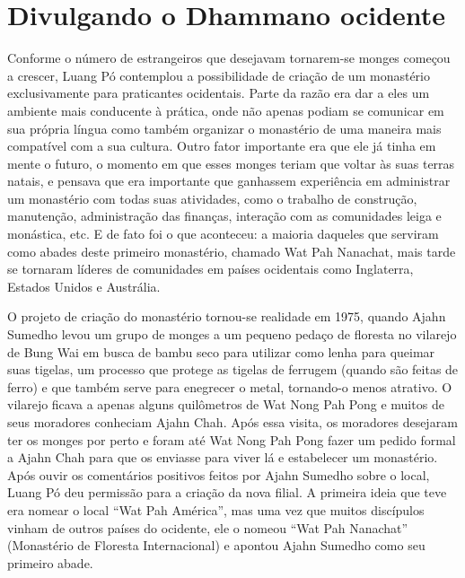 \chapter[Divulgando o Dhamma no ocidente]{Divulgando o Dhamma\newline no ocidente}

Conforme o número de estrangeiros que desejavam tornarem-se monges
começou a crescer, Luang Pó contemplou a possibilidade de criação de um
monastério exclusivamente para praticantes ocidentais. Parte da razão
era dar a eles um ambiente mais conducente à prática, onde não apenas
podiam se comunicar em sua própria língua como também organizar o
monastério de uma maneira mais compatível com a sua cultura. Outro fator
importante era que ele já tinha em mente o futuro, o momento em que
esses monges teriam que voltar às suas terras natais, e pensava que era
importante que ganhassem experiência em administrar um monastério com
todas suas atividades, como o trabalho de construção, manutenção,
administração das finanças, interação com as comunidades leiga e
monástica, etc. E de fato foi o que aconteceu: a maioria daqueles que
serviram como abades deste primeiro monastério, chamado Wat Pah
Nanachat, mais tarde se tornaram líderes de comunidades em países
ocidentais como Inglaterra, Estados Unidos e Austrália.

O projeto de criação do monastério tornou-se realidade em 1975, quando
Ajahn Sumedho levou um grupo de monges a um pequeno pedaço de floresta
no vilarejo de Bung Wai em busca de bambu seco para utilizar como lenha
para queimar suas tigelas, um processo que protege as tigelas de
ferrugem (quando são feitas de ferro) e que também serve para enegrecer
o metal, tornando-o menos atrativo. O vilarejo ficava a apenas alguns
quilômetros de Wat Nong Pah Pong e muitos de seus moradores conheciam
Ajahn Chah. Após essa visita, os moradores desejaram ter os monges por
perto e foram até Wat Nong Pah Pong fazer um pedido formal a Ajahn Chah
para que os enviasse para viver lá e estabelecer um monastério. Após
ouvir os comentários positivos feitos por Ajahn Sumedho sobre o local,
Luang Pó deu permissão para a criação da nova filial. A primeira ideia
que teve era nomear o local ``Wat Pah América'', mas uma vez que muitos
discípulos vinham de outros países do ocidente, ele o nomeou ``Wat Pah
Nanachat'' (Monastério de Floresta Internacional) e apontou Ajahn
Sumedho como seu primeiro abade.

